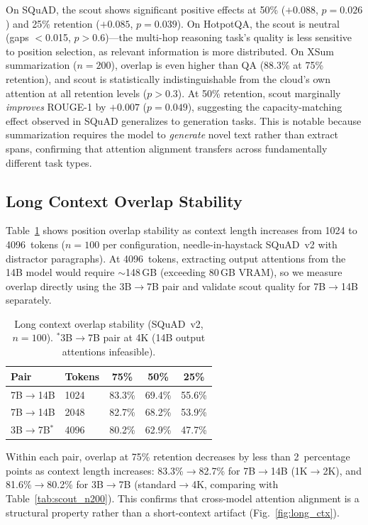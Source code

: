\documentclass[journal]{IEEEtran}
\begin{document}
On SQuAD, the scout shows significant positive effects at 50\% ($+0.088$, $p = 0.026$) and 25\% retention ($+0.085$, $p = 0.039$).
On HotpotQA, the scout is neutral (gaps $<$0.015, $p > 0.6$)---the multi-hop reasoning task's quality is less sensitive to position selection, as relevant information is more distributed.
On XSum summarization ($n = 200$), overlap is even higher than QA (88.3\% at 75\% retention), and scout is statistically indistinguishable from the cloud's own attention at all retention levels ($p > 0.3$).
At 50\% retention, scout marginally \emph{improves} ROUGE-1 by $+0.007$ ($p = 0.049$), suggesting the capacity-matching effect observed in SQuAD generalizes to generation tasks.
This is notable because summarization requires the model to \emph{generate} novel text rather than extract spans, confirming that attention alignment transfers across fundamentally different task types.

\subsection{Long Context Overlap Stability}

Table~\ref{tab:long_ctx} shows position overlap stability as context length increases from 1024 to 4096~tokens ($n = 100$ per configuration, needle-in-haystack SQuAD~v2 with distractor paragraphs).
At 4096~tokens, extracting output attentions from the 14B model would require $\sim$148\,GB (exceeding 80\,GB VRAM), so we measure overlap directly using the 3B$\to$7B pair and validate scout quality for 7B$\to$14B separately.

\begin{table}[t]
\centering
\caption{Long context overlap stability (SQuAD~v2, $n = 100$). $^*$3B$\to$7B pair at 4K (14B output attentions infeasible).}
\label{tab:long_ctx}
\small
\begin{tabular}{@{}llccc@{}}
\toprule
\textbf{Pair} & \textbf{Tokens} & \textbf{75\%} & \textbf{50\%} & \textbf{25\%} \\
\midrule
7B$\to$14B & 1024 & 83.3\% & 69.4\% & 55.6\% \\
7B$\to$14B & 2048 & 82.7\% & 68.2\% & 53.9\% \\
3B$\to$7B$^*$ & 4096 & 80.2\% & 62.9\% & 47.7\% \\
\bottomrule
\end{tabular}
\end{table}

Within each pair, overlap at 75\% retention decreases by less than 2~percentage points as context length increases: 83.3\%$\to$82.7\% for 7B$\to$14B (1K$\to$2K), and 81.6\%$\to$80.2\% for 3B$\to$7B (standard$\to$4K, comparing with Table~\ref{tab:scout_n200}).
This confirms that cross-model attention alignment is a structural property rather than a short-context artifact (Fig.~\ref{fig:long_ctx}).
\end{document}
